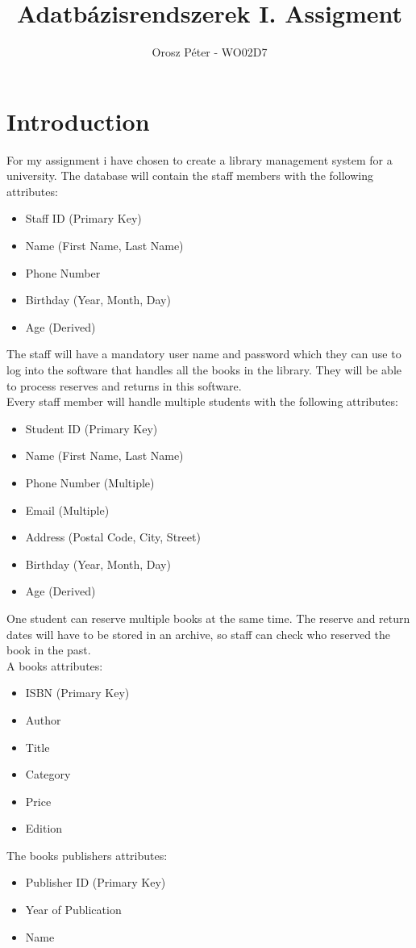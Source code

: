 \documentclass[11pt]{article}
\title{Adatbázisrendszerek I. Assigment}
\author{Orosz Péter - WO02D7}
\begin{document}
	\maketitle
	\newpage
	\tableofcontents
	\newpage
	\section{Introduction}
		For my assignment i have chosen to create a library management system for a university.
		The database will contain the staff members with the following attributes:
		\begin{itemize}
			\item Staff ID (Primary Key)
			\item Name (First Name, Last Name)
			\item Phone Number
			\item Birthday (Year, Month, Day)
			\item Age (Derived)
		\end{itemize}
		The staff will have a mandatory user name and password which they can use to log into the software that handles all the books in the library. They will be able to process reserves and returns in this software.\\
		Every staff member will handle multiple students with the following attributes:
		\begin{itemize}
			\item Student ID (Primary Key)
			\item Name (First Name, Last Name)
			\item Phone Number (Multiple)
			\item Email (Multiple)
			\item Address (Postal Code, City, Street)
			\item Birthday (Year, Month, Day)
			\item Age (Derived)
		\end{itemize}
		One student can reserve multiple books at the same time. The reserve and return dates will have to be stored in an archive, so staff can check who reserved the book in the past.\\
		A books attributes:
		\begin{itemize}
			\item ISBN (Primary Key)
			\item Author
			\item Title
			\item Category
			\item Price
			\item Edition
		\end{itemize}
		The books publishers attributes:
		\begin{itemize}
		 	\item Publisher ID (Primary Key)
		 	\item Year of Publication
		 	\item Name
		\end{itemize}
	
\end{document}
